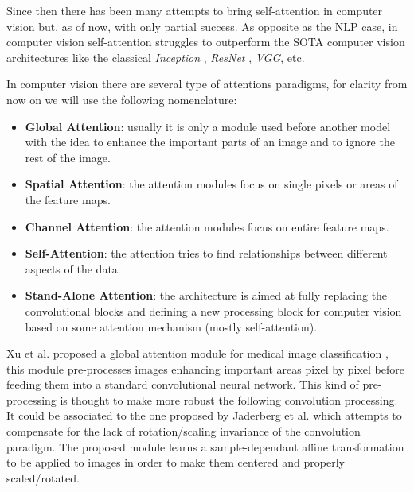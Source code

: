 \documentclass[fleqn,10pt]{SelfArx}
\begin{document}
Since then there has been many attempts to bring self-attention in computer vision but, as of now, with only partial success. As opposite as the NLP case, in computer vision self-attention struggles to outperform the SOTA computer vision architectures like the classical \textit{Inception} \cite{inception},  \textit{ResNet} \cite{resnet}, \textit{VGG}, \cite{vgg} etc.

In computer vision there are several type of attentions paradigms, for clarity from now on we will use the following nomenclature:

\begin{itemize}
  \item \textbf{Global Attention}: usually it is only a module used before another model with the idea to enhance the important parts of an image and to ignore the rest of the image.
  \item \textbf{Spatial Attention}: the attention modules focus on single pixels or areas of the feature maps.
  \item \textbf{Channel Attention}: the attention modules focus on entire feature maps.
  \item \textbf{Self-Attention}: the attention tries to find relationships between different aspects of the data.
  \item \textbf{Stand-Alone Attention}: the architecture is aimed at fully replacing the convolutional blocks and defining a new processing block for computer vision based on some attention mechanism (mostly self-attention).
\end{itemize}

Xu et al. proposed a global attention module for medical image classification \cite{xu2020novel}, this module pre-processes images enhancing important areas pixel by pixel before feeding them into a standard convolutional neural network. This kind of pre-processing is thought to make more robust the following convolution processing. It could be associated to the one proposed by Jaderberg et al. \cite{jaderberg2015spatial} which attempts to compensate for the lack of rotation/scaling invariance of the convolution paradigm. The proposed module learns a sample-dependant affine transformation to be applied to images in order to make them centered and properly scaled/rotated. 
\end{document}
